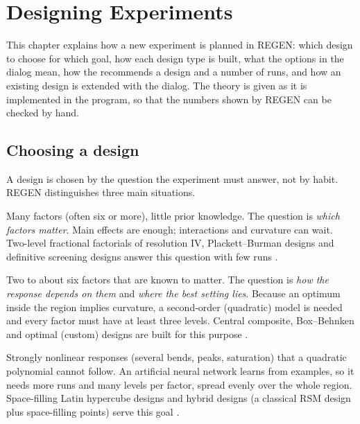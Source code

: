 \chapter{Designing Experiments}\label{chap:3}
\label{ch:designs}

This chapter explains how a new experiment is planned in REGEN: which design to choose for which goal, how each
design type is built, what the options in the  dialog mean, how the  recommends a
design and a number of runs, and how an existing design is extended with the  dialog. The theory
is given as it is implemented in the program, so that the numbers shown by REGEN can be checked by hand.

\section{Choosing a design}
\label{sec:ch03-choosing}

A design is chosen by the question the experiment must answer, not by habit. REGEN distinguishes three main
situations.

\begin{description}[leftmargin=0pt]
\item[Screening.] Many factors (often six or more), little prior knowledge. The question is \emph{which factors
matter}. Main effects are enough; interactions and curvature can wait. Two-level fractional factorials of
resolution IV, Plackett--Burman designs and definitive screening designs answer this question with few runs
\citep{montgomery2017,jones2011}.
\item[Characterization and optimization (RSM).] Two to about six factors that are known to matter. The question is
\emph{how the response depends on them} and \emph{where the best setting lies}. Because an optimum inside the
region implies curvature, a second-order (quadratic) model is needed and every factor must have at least three
levels. Central composite, Box--Behnken and optimal (custom) designs are built for this purpose
\citep{box1951,box1960,myers2016}.
\item[Machine learning (ANN).] Strongly nonlinear responses (several bends, peaks, saturation) that a quadratic
polynomial cannot follow. An artificial neural network learns from examples, so it needs more runs and many levels
per factor, spread evenly over the whole region. Space-filling Latin hypercube designs and hybrid designs (a
classical RSM design plus space-filling points) serve this goal \citep{mckay1979,morris1995}.
\end{description}

